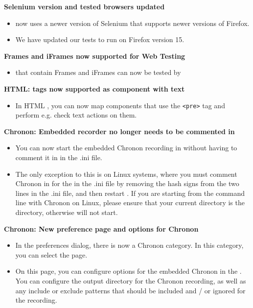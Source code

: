 \textbf{Selenium version and tested browsers updated}
\begin{itemize}
\item \app{} now uses a newer version of Selenium that supports newer versions of Firefox.
\item We have updated our tests to run on Firefox version 15.
\end{itemize}

\textbf{Frames and iFrames now supported for Web Testing}
\begin{itemize}
\item \gdauts{} that contain Frames and iFrames can now be tested by \app{}
\end{itemize}

\textbf{HTML: tags now supported as component with text}
\begin{itemize}
\item In HTML \gdauts{}, you can now map components that use the \verb+<pre>+ tag and perform e.g. check text actions on them.
\end{itemize}

\textbf{Chronon: Embedded recorder no longer needs to be commented in}
\begin{itemize}
\item You can now start the embedded Chronon recording in \app{} without having to comment it in in the .ini file. 
\item The only exception to this is on Linux systems, where you must comment Chronon in for the \ite{} in the .ini file by removing the hash signs from the two lines in the .ini file, and then restart \app{}. If you are starting \app{} from the command line with Chronon on Linux, please ensure that your current directory is the \app{} directory, otherwise \app{} will not start.
\end{itemize}

\textbf{Chronon: New preference page and options for \ite{} Chronon}
\begin{itemize}
\item In the preferences dialog, there is now a Chronon category. In this category, you can select the  page. 
\item On this page, you can configure options for the embedded Chronon in the \ite{}. You can configure the output directory for the Chronon recording, as well as any include or exclude patterns that should be included and / or ignored for the recording.  
\end{itemize}

